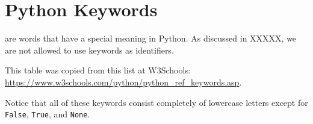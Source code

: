 
\chapter{Python Keywords}

 are words that have a special meaning in Python.  As discussed in XXXXX, we are not allowed to use keywords as identifiers.

This table was copied from this list at W3Schools: \url{https://www.w3schools.com/python/python_ref_keywords.asp}.

Notice that all of these keywords consist completely of lowercase letters except for \texttt{False}, \texttt{True}, and \texttt{None}.

\bigskip


 \label{tab:keywords}

    

\tablelasttail{\hline \hline}


